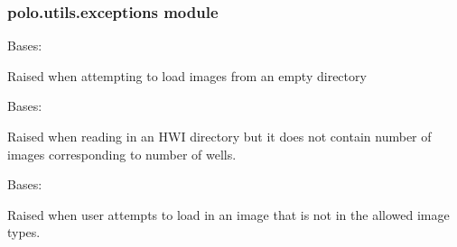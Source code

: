 \documentclass[letterpaper,10pt,english]{sphinxmanual}
\begin{document}
\subsubsection{polo.utils.exceptions module}
\label{\detokenize{polo.utils:module-polo.utils.exceptions}}\label{\detokenize{polo.utils:polo-utils-exceptions-module}}

\begin{fulllineitems}
\label{\detokenize{polo.utils:polo.utils.exceptions.EmptyDirectoryError}}
Bases: 

Raised when attempting to load images from an empty directory

\end{fulllineitems}


\begin{fulllineitems}
\label{\detokenize{polo.utils:polo.utils.exceptions.EmptyRunNameError}}
Bases: 

Raised when reading in an HWI directory but it does not contain number
of images corresponding to number of wells.

\end{fulllineitems}


\begin{fulllineitems}
\label{\detokenize{polo.utils:polo.utils.exceptions.ForbiddenImageTypeError}}
Bases: 

Raised when user attempts to load in an image that is not in the allowed
image types.

\end{fulllineitems}
\end{document}

